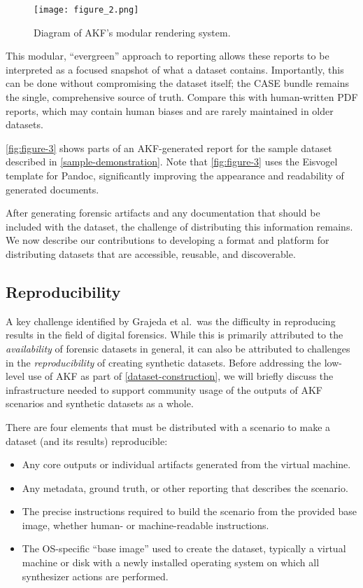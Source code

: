 \begin{figure*}[htbp]
\centering
\texttt{[image: figure\_2.png]}
\caption{Diagram of AKF's modular rendering system.}\label{fig:figure-2}
\end{figure*}

This modular, ``evergreen'' approach to reporting allows these reports
to be interpreted as a focused snapshot of what a dataset contains.
Importantly, this can be done without compromising the dataset itself;
the CASE bundle remains the single, comprehensive source of truth.
Compare this with human-written PDF reports, which may contain human
biases and are rarely maintained in older datasets.

\autoref{fig:figure-3} shows parts of an AKF-generated report for the
sample dataset described in \autoref{sample-demonstration}. Note that
\autoref{fig:figure-3} uses the Eisvogel template
\citep{waglerWandmalfarbePandoclatextemplate2025} for Pandoc,
significantly improving the appearance and readability of generated
documents.

After generating forensic artifacts and any documentation that should be
included with the dataset, the challenge of distributing this
information remains. We now describe our contributions to developing a
format and platform for distributing datasets that are accessible,
reusable, and discoverable.

\subsection{Reproducibility}\label{reproducibility}

A key challenge identified by Grajeda et al.~was the difficulty in
reproducing results in the field of digital forensics. While this is
primarily attributed to the \emph{availability} of forensic datasets in
general, it can also be attributed to challenges in the
\emph{reproducibility} of creating synthetic datasets. Before addressing
the low-level use of AKF as part of \autoref{dataset-construction}, we
will briefly discuss the infrastructure needed to support community
usage of the outputs of AKF scenarios and synthetic datasets as a whole.

There are four elements that must be distributed with a scenario to make
a dataset (and its results) reproducible:

\begin{itemize}
\item
  Any core outputs or individual artifacts generated from the virtual
  machine.
\item
  Any metadata, ground truth, or other reporting that describes the
  scenario.
\item
  The precise instructions required to build the scenario from the
  provided base image, whether human- or machine-readable instructions.
\item
  The OS-specific ``base image'' used to create the dataset, typically a
  virtual machine or disk with a newly installed operating system on
  which all synthesizer actions are performed.
\end{itemize}

